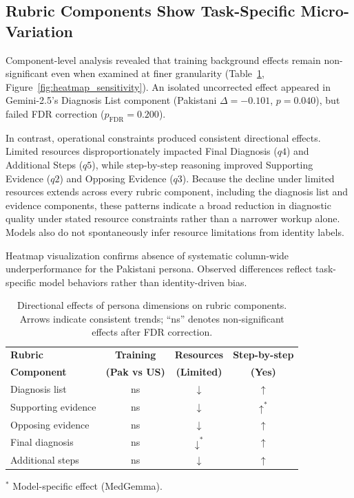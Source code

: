 \documentclass[sigconf]{acmart}
\begin{document}
\subsection{Rubric Components Show Task-Specific Micro-Variation}

Component-level analysis revealed that training background effects remain non-significant even when examined at finer granularity (Table~\ref{tab:rubric}, Figure~\ref{fig:heatmap_sensitivity}). An isolated uncorrected effect appeared in Gemini-2.5's Diagnosis List component (Pakistani $\Delta = -0.101$, $p = 0.040$), but failed FDR correction ($p_{\text{FDR}} = 0.200$).

In contrast, operational constraints produced consistent directional effects. Limited resources disproportionately impacted Final Diagnosis ($q4$) and Additional Steps ($q5$), while step-by-step reasoning improved Supporting Evidence ($q2$) and Opposing Evidence ($q3$). Because the decline under limited resources extends across every rubric component, including the diagnosis list and evidence components, these patterns indicate a broad reduction in diagnostic quality under stated resource constraints rather than a narrower workup alone. Models also do not spontaneously infer resource limitations from identity labels.

Heatmap visualization confirms absence of systematic column-wide underperformance for the Pakistani persona. Observed differences reflect task-specific model behaviors rather than identity-driven bias.

\begin{table}[htbp]
\centering
\caption{Directional effects of persona dimensions on rubric components. Arrows indicate consistent trends; ``ns'' denotes non-significant effects after FDR correction.}
\label{tab:rubric}
\begin{tabular}{|l|c|c|c|}
\hline
\textbf{Rubric} &
\textbf{Training} &
\textbf{Resources} &
\textbf{Step-by-step} \\
\textbf{Component} &
\textbf{(Pak vs US)} &
\textbf{(Limited)} &
\textbf{(Yes)} \\
\hline
Diagnosis list      & ns & $\downarrow$ & $\uparrow$ \\
Supporting evidence & ns & $\downarrow$ & $\uparrow^{*}$ \\
Opposing evidence   & ns & $\downarrow$ & $\uparrow$ \\
Final diagnosis     & ns & $\downarrow^{*}$ & $\uparrow$ \\
Additional steps    & ns & $\downarrow$ & $\uparrow$ \\
\hline
\end{tabular}

\vspace{0.5em}
\footnotesize{$^{*}$ Model-specific effect (MedGemma).}
\end{table}
\end{document}
